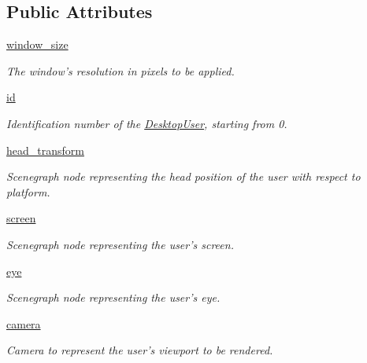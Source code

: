 \subsection*{\-Public \-Attributes}
\begin{DoxyCompactItemize}
\item 
\hyperlink{classlib_1_1DesktopUser_1_1DesktopUser_ac94bc2ab0896281bf2f8b63eca0014de}{window\-\_\-size}
\begin{DoxyCompactList}\small\item\em \-The window's resolution in pixels to be applied. \end{DoxyCompactList}\item 
\hyperlink{classlib_1_1DesktopUser_1_1DesktopUser_a53df88c4db8bb02814412976ec4da27f}{id}
\begin{DoxyCompactList}\small\item\em \-Identification number of the \hyperlink{classlib_1_1DesktopUser_1_1DesktopUser}{\-Desktop\-User}, starting from 0. \end{DoxyCompactList}\item 
\hyperlink{classlib_1_1DesktopUser_1_1DesktopUser_a27921d96ba4507753c706d9f07c3a1dc}{head\-\_\-transform}
\begin{DoxyCompactList}\small\item\em \-Scenegraph node representing the head position of the user with respect to platform. \end{DoxyCompactList}\item 
\hyperlink{classlib_1_1DesktopUser_1_1DesktopUser_aa1574dd41324f3879953bf1c2eae1e81}{screen}
\begin{DoxyCompactList}\small\item\em \-Scenegraph node representing the user's screen. \end{DoxyCompactList}\item 
\hyperlink{classlib_1_1DesktopUser_1_1DesktopUser_abb5723cfd58d530bc7366502f4b1a990}{eye}
\begin{DoxyCompactList}\small\item\em \-Scenegraph node representing the user's eye. \end{DoxyCompactList}\item 
\hyperlink{classlib_1_1DesktopUser_1_1DesktopUser_a720a932f2cf25bc04f1411674c76378e}{camera}
\begin{DoxyCompactList}\small\item\em \-Camera to represent the user's viewport to be rendered. \end{DoxyCompactList}\item 

\end{DoxyCompactItemize}
